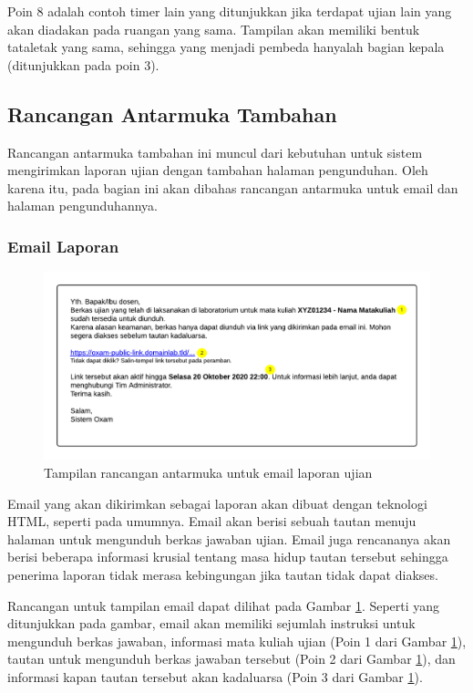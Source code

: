     Poin 8 adalah contoh timer lain yang ditunjukkan jika terdapat ujian lain yang akan diadakan pada
    ruangan yang sama. Tampilan akan memiliki bentuk tataletak yang sama, sehingga yang menjadi pembeda
    hanyalah bagian kepala (ditunjukkan pada poin 3).
    
    
\subsection{Rancangan Antarmuka Tambahan}
    Rancangan antarmuka tambahan ini muncul dari kebutuhan untuk sistem mengirimkan laporan
    ujian dengan tambahan halaman pengunduhan. Oleh karena itu, pada bagian ini akan dibahas rancangan 
    antarmuka untuk email dan halaman pengunduhannya.
    
\subsubsection{Email Laporan}
    \begin{figure}
        \centering
        \includegraphics[width=0.7\paperwidth]{Gambar/mockups/Mockup--Tambahan.pdf}
        \caption{Tampilan rancangan antarmuka untuk email laporan ujian}
        \label{fig:mockup_addition_email}
    \end{figure}
    Email yang akan dikirimkan sebagai laporan akan dibuat dengan teknologi HTML, seperti pada umumnya.
    Email akan berisi sebuah tautan menuju halaman untuk mengunduh berkas jawaban ujian. Email juga
    rencananya akan berisi beberapa informasi krusial tentang masa hidup tautan tersebut sehingga
    penerima laporan tidak merasa kebingungan jika tautan tidak dapat diakses.
    
    Rancangan untuk tampilan email dapat dilihat pada Gambar \ref{fig:mockup_addition_email}. Seperti yang
    ditunjukkan pada gambar, email akan memiliki sejumlah instruksi untuk mengunduh berkas jawaban, informasi
    mata kuliah ujian (Poin 1 dari Gambar \ref{fig:mockup_addition_email}), tautan untuk mengunduh berkas
    jawaban tersebut (Poin 2 dari Gambar \ref{fig:mockup_addition_email}), dan informasi kapan tautan
    tersebut akan kadaluarsa (Poin 3 dari Gambar \ref{fig:mockup_addition_email}).
    
